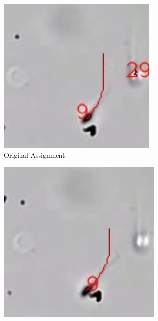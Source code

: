 \begin{figure}[h]
     \centering
     \begin{subfigure}[b]{0.3\textwidth}
         \centering
         \includegraphics[width=\textwidth]{Images/sam5-4.png}
         \caption{Original Assignment}
     \end{subfigure}
     \hfill
     \begin{subfigure}[b]{0.3\textwidth}
         \centering
         \includegraphics[width=\textwidth]{Images/sam5-5.png}

\end{subfigure}
\end{figure}
